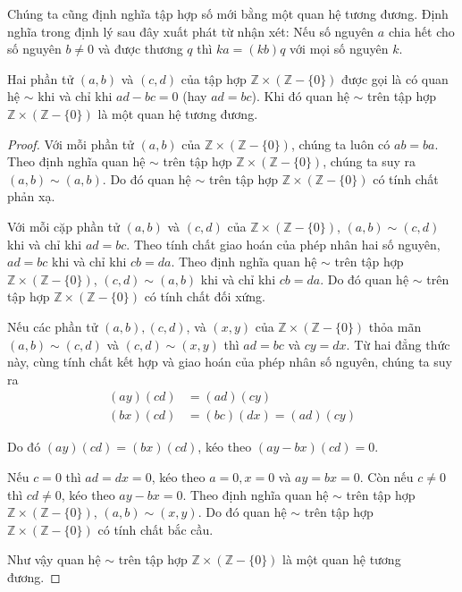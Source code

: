 Chúng ta cũng định nghĩa tập hợp số mới bằng một quan hệ tương đương. Định nghĩa trong định lý sau đây xuất phát từ nhận xét: Nếu số nguyên $a$ chia hết cho số nguyên $b\ne 0$ và được thương $q$ thì $k a = (k b) q$ với mọi số nguyên $k$.

\begin{theorem}
    Hai phần tử $(a, b)$ và $(c, d)$ của tập hợp $\mathbb{Z}\times(\mathbb{Z} - \{0\})$ được gọi là có quan hệ $\sim$ khi và chỉ khi $a d - b c = 0$ (hay $a d = b c$). Khi đó quan hệ $\sim$ trên tập hợp $\mathbb{Z}\times(\mathbb{Z} - \{0\})$ là một quan hệ tương đương.
\end{theorem}

\begin{proof}
    Với mỗi phần tử $(a, b)$ của $\mathbb{Z}\times(\mathbb{Z} - \{0\})$, chúng ta luôn có $a b = b a$. Theo định nghĩa quan hệ $\sim$ trên tập hợp $\mathbb{Z}\times(\mathbb{Z} - \{0\})$, chúng ta suy ra $(a, b)\sim (a, b)$. Do đó quan hệ $\sim$ trên tập hợp $\mathbb{Z}\times(\mathbb{Z} - \{0\})$ có tính chất phản xạ.

    Với mỗi cặp phần tử $(a, b)$ và $(c, d)$ của $\mathbb{Z}\times(\mathbb{Z} - \{0\})$, $(a, b)\sim (c, d)$ khi và chỉ khi $a d = b c$. Theo tính chất giao hoán của phép nhân hai số nguyên, $a d = b c$ khi và chỉ khi $c b = d a$.  Theo định nghĩa quan hệ $\sim$ trên tập hợp $\mathbb{Z}\times(\mathbb{Z} - \{0\})$, $(c, d)\sim (a, b)$ khi và chỉ khi $c b = d a$. Do đó quan hệ $\sim$ trên tập hợp $\mathbb{Z}\times(\mathbb{Z} - \{0\})$ có tính chất đối xứng.

    Nếu các phần tử $(a, b), (c, d)$, và $(x, y)$ của $\mathbb{Z}\times(\mathbb{Z} - \{0\})$ thỏa mãn $(a, b)\sim (c, d)$ và $(c, d)\sim (x, y)$ thì $a d = b c$ và $c y = d x$. Từ hai đẳng thức này, cùng tính chất kết hợp và giao hoán của phép nhân số nguyên, chúng ta suy ra
    \begin{align*}
        (a y) (c d) & = (a d) (c y)               \\
        (b x) (c d) & = (b c) (d x) = (a d) (c y)
    \end{align*}

    Do đó $(a y) (c d) = (b x) (c d)$, kéo theo $(a y - b x) (c d) = 0$.

    Nếu $c = 0$ thì $a d = d x = 0$, kéo theo $a = 0, x = 0$ và $a y = b x = 0$. Còn nếu $c\ne 0$ thì $c d\ne 0$, kéo theo $a y - b x = 0$. Theo định nghĩa quan hệ $\sim$ trên tập hợp $\mathbb{Z}\times(\mathbb{Z} - \{0\})$, $(a, b)\sim (x, y)$. Do đó quan hệ $\sim$ trên tập hợp $\mathbb{Z}\times(\mathbb{Z} - \{0\})$ có tính chất bắc cầu.

    Như vậy quan hệ $\sim$ trên tập hợp $\mathbb{Z}\times(\mathbb{Z} - \{0\})$ là một quan hệ tương đương.
\end{proof}


